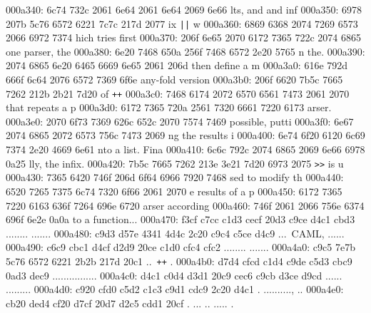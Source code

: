 \begin{bo
00010e0: 7865 647d 5c62 6567 696e 7b76 6572 6261  xed}
\begin{verba
00010f0: 7469 6d7d 0a20 2023 7479 7065 2074 6572  tim}
\begin{
0001c40: 7665 7262 6174 696d 7d0a 2020 236c 6574  verbatim}
\begin{boxe
00027a0: 647d 5c62 6567 696e 7b76 6572 6261 7469  d}
\begin{verbati
00027b0: 6d7d 0a20 2023 6c65 7420 696e 6669 7865  m}
\begin{v
0002c60: 6572 6261 7469 6d7d 0a20 2023 6c65 7420  erbatim}
\begin{
0002dc0: 7665 7262 6174 696d 7d0a 2020 236c 6574  verbatim}
\begin{boxed
0002f30: 7d5c 6265 6769 6e7b 7665 7262 6174 696d  }
\begin{verbatim
0002f40: 7d0a 2020 236c 6574 2068 6428 683a 3a74  }
\begin{v
0003e60: 6572 6261 7469 6d7d 0a20 2023 236f 7065  erbatim}
\begin{boxed
00042b0: 7d5c 6265 6769 6e7b 7665 7262 6174 696d  }
\begin{verbatim
00042c0: 7d0a 2020 2328 782c 7429 3b3b 0a20 202d  }
000a340: 6c74 732c 2061 6e64 2061 6e64 2069 6e66  lts, and and inf
000a350: 6978 207b 5c76 6572 6221 7c7c 217d 2077  ix {\verb!||!} w
000a360: 6869 6368 2074 7269 6573 2066 6972 7374  hich tries first
000a370: 206f 6e65 2070 6172 7365 722c 2074 6865   one parser, the
000a380: 6e20 7468 650a 256f 7468 6572 2e20 5765  n the.%
000a390: 2074 6865 6e20 6465 6669 6e65 2061 206d   then define a m
000a3a0: 616e 792d 666f 6c64 2076 6572 7369 6f6e  any-fold version
000a3b0: 206f 6620 7b5c 7665 7262 212b 2b21 7d20   of {\verb!++!} 
000a3c0: 7468 6174 2072 6570 6561 7473 2061 2070  that repeats a p
000a3d0: 6172 7365 720a 2561 7320 6661 7220 6173  arser.%
000a3e0: 2070 6f73 7369 626c 652c 2070 7574 7469   possible, putti
000a3f0: 6e67 2074 6865 2072 6573 756c 7473 2069  ng the results i
000a400: 6e74 6f20 6120 6c69 7374 2e20 4669 6e61  nto a list. Fina
000a410: 6c6c 792c 2074 6865 2069 6e66 6978 0a25  lly, the infix.%
000a420: 7b5c 7665 7262 213e 3e21 7d20 6973 2075  {\verb!>>!} is u
000a430: 7365 6420 746f 206d 6f64 6966 7920 7468  sed to modify th
000a440: 6520 7265 7375 6c74 7320 6f66 2061 2070  e results of a p
000a450: 6172 7365 7220 6163 636f 7264 696e 6720  arser according 
000a460: 746f 2061 2066 756e 6374 696f 6e2e 0a0a  to a function...
000a470: f3cf c7cc c1d3 cecf 20d3 c9ce d4c1 cbd3  ........ .......
000a480: c9d3 d57e 4341 4d4c 2c20 c9c4 c5ce d4c9  ...~CAML, ......
000a490: c6c9 cbc1 d4cf d2d9 20ce c1d0 cfc4 cfc2  ........ .......
000a4a0: c9c5 7e7b 5c76 6572 6221 2b2b 217d 20c1  ..~{\verb!++!} .
000a4b0: d7d4 cfcd c1d4 c9de c5d3 cbc9 0ad3 dec9  ................
000a4c0: d4c1 c0d4 d3d1 20c9 cec6 c9cb d3ce d9cd  ...... .........
000a4d0: c920 cfd0 c5d2 c1c3 c9d1 cdc9 2c20 d4c1  . .........., ..
000a4e0: cb20 ded4 cf20 d7cf 20d7 d2c5 cdd1 20cf  . ... .. ..... .

\end{verbatim
00042c0: 7d0a 2020 2328 782c 7429 3b3b 0a20 202d  }
\end{boxed
00042b0: 7d5c 6265 6769 6e7b 7665 7262 6174 696d  }
\end{v
0003e60: 6572 6261 7469 6d7d 0a20 2023 236f 7065  erbatim}
\end{verbatim
0002f40: 7d0a 2020 236c 6574 2068 6428 683a 3a74  }
\end{boxed
0002f30: 7d5c 6265 6769 6e7b 7665 7262 6174 696d  }
\end{
0002dc0: 7665 7262 6174 696d 7d0a 2020 236c 6574  verbatim}
\end{v
0002c60: 6572 6261 7469 6d7d 0a20 2023 6c65 7420  erbatim}
\end{verbati
00027b0: 6d7d 0a20 2023 6c65 7420 696e 6669 7865  m}
\end{boxe
00027a0: 647d 5c62 6567 696e 7b76 6572 6261 7469  d}
\end{
0001c40: 7665 7262 6174 696d 7d0a 2020 236c 6574  verbatim}
\end{verba
00010f0: 7469 6d7d 0a20 2023 7479 7065 2074 6572  tim}
\end{bo
00010e0: 7865 647d 5c62 6567 696e 7b76 6572 6261  xed}
